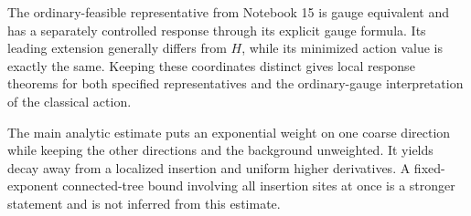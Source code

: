 \documentclass[11pt]{article}
\theoremstyle{remark}
\begin{document}
The ordinary-feasible representative from Notebook 15 is gauge
equivalent and has a separately controlled response through its
explicit gauge formula. Its leading extension generally differs
from $H$, while its minimized action value is exactly the same.
Keeping these coordinates distinct gives local response theorems
for both specified representatives and the ordinary-gauge
interpretation of the classical action.

The main analytic estimate puts an exponential weight on one
coarse direction while keeping the other directions and the
background unweighted. It yields decay away from a localized
insertion and uniform higher derivatives. A fixed-exponent
connected-tree bound involving all insertion sites at once is
a stronger statement and is not inferred from this estimate.
\end{document}
